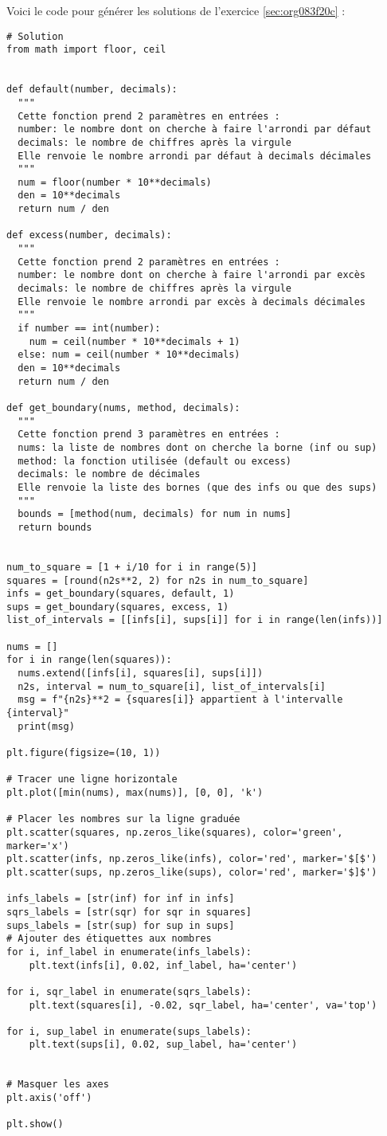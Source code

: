 \documentclass[a4paper, 11pt, twoside]{article}
\begin{document}
Voici le code pour générer les solutions de l'exercice \ref{sec:org083f20c} :
\begin{verbatim}
# Solution
from math import floor, ceil


def default(number, decimals):
  """
  Cette fonction prend 2 paramètres en entrées :
  number: le nombre dont on cherche à faire l'arrondi par défaut
  decimals: le nombre de chiffres après la virgule
  Elle renvoie le nombre arrondi par défaut à decimals décimales
  """
  num = floor(number * 10**decimals)
  den = 10**decimals
  return num / den

def excess(number, decimals):
  """
  Cette fonction prend 2 paramètres en entrées :
  number: le nombre dont on cherche à faire l'arrondi par excès
  decimals: le nombre de chiffres après la virgule
  Elle renvoie le nombre arrondi par excès à decimals décimales
  """
  if number == int(number):
    num = ceil(number * 10**decimals + 1)
  else: num = ceil(number * 10**decimals)
  den = 10**decimals
  return num / den

def get_boundary(nums, method, decimals):
  """
  Cette fonction prend 3 paramètres en entrées :
  nums: la liste de nombres dont on cherche la borne (inf ou sup)
  method: la fonction utilisée (default ou excess)
  decimals: le nombre de décimales
  Elle renvoie la liste des bornes (que des infs ou que des sups)
  """
  bounds = [method(num, decimals) for num in nums]
  return bounds


num_to_square = [1 + i/10 for i in range(5)]
squares = [round(n2s**2, 2) for n2s in num_to_square]
infs = get_boundary(squares, default, 1)
sups = get_boundary(squares, excess, 1)
list_of_intervals = [[infs[i], sups[i]] for i in range(len(infs))]

nums = []
for i in range(len(squares)):
  nums.extend([infs[i], squares[i], sups[i]])
  n2s, interval = num_to_square[i], list_of_intervals[i]
  msg = f"{n2s}**2 = {squares[i]} appartient à l'intervalle {interval}"
  print(msg)

plt.figure(figsize=(10, 1))

# Tracer une ligne horizontale
plt.plot([min(nums), max(nums)], [0, 0], 'k')

# Placer les nombres sur la ligne graduée
plt.scatter(squares, np.zeros_like(squares), color='green', marker='x')
plt.scatter(infs, np.zeros_like(infs), color='red', marker='$[$')
plt.scatter(sups, np.zeros_like(sups), color='red', marker='$]$')

infs_labels = [str(inf) for inf in infs]
sqrs_labels = [str(sqr) for sqr in squares]
sups_labels = [str(sup) for sup in sups]
# Ajouter des étiquettes aux nombres
for i, inf_label in enumerate(infs_labels):
    plt.text(infs[i], 0.02, inf_label, ha='center')

for i, sqr_label in enumerate(sqrs_labels):
    plt.text(squares[i], -0.02, sqr_label, ha='center', va='top')

for i, sup_label in enumerate(sups_labels):
    plt.text(sups[i], 0.02, sup_label, ha='center')


# Masquer les axes
plt.axis('off')

plt.show()
\end{verbatim}
\stopcontents[level-2]
\end{document}
